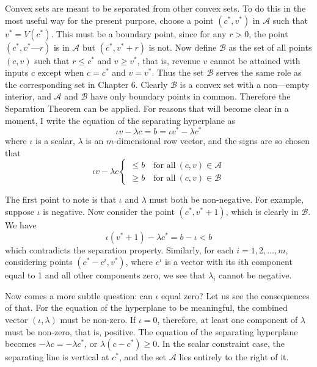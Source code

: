 Convex sets are meant to be separated from other convex sets. To do this in the most useful way for the present purpose, choose a point $(c^*, v^*)$ in $\mathcal{A}$ such that $v^* = V(c^*)$. This must be a boundary point, since for any $r > 0$, the point $(c^*,v^* —r)$ is in $\mathcal{A}$ but $(c^*, v^* +r)$ is not. Now define $\mathcal{B}$ as the set of all points $(c,v)$ such that $r \leq c^*$ and $v \geq v^*$, that is, revenue $v$ cannot be attained with inputs $c$ except when $c = c^*$ and $v = v^*$. Thus the set $\mathcal{B}$ serves the same role as the corresponding set in Chapter 6. Clearly $\mathcal{B}$ is a convex set with a non—empty interior, and $\mathcal{A}$ and $\mathcal{B}$ have only boundary points in common. Therefore the Separation Theorem can be applied. For reasons that will become clear in a moment, I write the equation of the separating hyperplane as
\begin{equation*}
\iota v - \lambda c = b = \iota v^* - \lambda c^*
\end{equation*}
where $\iota$ is a scalar, $\lambda$ is an $m$-dimensional row vector, and the signs are so chosen that
\begin{equation} \label{equa7.3}
\iota v - \lambda c \left\{  
\begin{array}{ll}
\leq b \quad \mbox{for all} \  (c,v) \in \mathcal{A} \\
\geq b \quad \mbox{for all} \  (c,v) \in \mathcal{B}
\end{array}
 \right.
\end{equation}

The first point to note is that $\iota$ and $\lambda$ must both be non-negative. For example, suppose $\iota$ is negative. Now consider the point $(c^*, v^*+1)$, which is clearly in $\mathcal{B}$. We have
\begin{equation*}
\iota (v^* +1) - \lambda c^* = b - \iota < b
\end{equation*}
which contradicts the separation property. Similarly, for each $i=1,2,\dots,m$, considering points $(c^* - c^i, v^*)$, where $e^i$ is a vector with its $i$th component equal to 1 and all other components zero, we see that $\lambda_i$ cannot be negative.

Now comes a more subtle question: can $\iota$ equal zero? Let us see the consequences of that. For the equation of the hyperplane to be meaningful, the combined vector $(\iota, \lambda)$ must be non-zero. If $\iota =0$, therefore, at least one component of $\lambda$ must be non-zero, that is, positive. The equation of the separating hyperplane becomes $-\lambda c = -\lambda c^*$, or $\lambda (c-c^*) \geq 0$. In the scalar constraint case, the separating line is vertical at $c^*$, and the set $\mathcal{A}$ lies entirely to the right of it.

